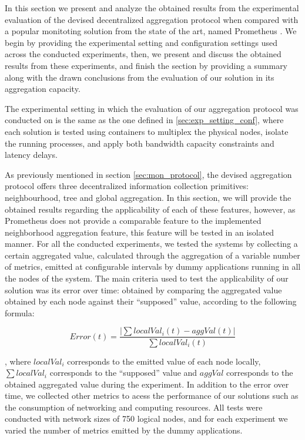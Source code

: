 

In this section we present and analyze the obtained results from the experimental evaluation of the devised decentralized aggregation protocol when compared with a popular monitoting solution from the state of the art, named Prometheus . We begin by providing the experimental setting and configuration settings used across the conducted experiments, then, we present and discuss the obtained results from these experiments, and finish the section by providing a summary along with the drawn conclusions from the evaluation of our solution in its aggregation capacity.

The experimental setting in which the evaluation of our aggregation protocol was conducted on is the same as the one defined in \ref{sec:exp_setting_conf}, where each solution is tested using containers to multiplex the physical nodes, isolate the running processes, and apply both bandwidth capacity constraints and latency delays.

As previously mentioned in section \ref{sec:mon_protocol}, the devised aggregation protocol offers three decentralized information collection primitives: neighbourhood, tree and global aggregation. In this section, we will provide the obtained results regarding the applicability of each of these features, however, as Prometheus does not provide a comparable feature to the implemented neighborhood aggregation feature, this feature will be tested in an isolated manner. For all the conducted experiments, we tested the systems by collecting a certain aggregated value, calculated through the aggregation of a variable number of metrics, emitted at configurable intervals by dummy applications running in all the nodes of the system. The main criteria used to test the applicability of our solution was its error over time: obtained by comparing the aggregated value obtained by each node against their ``supposed'' value, according to the following formula: 

\[ Error(t) =  \frac{|\sum localVal_i(t) - aggVal(t)|}{\sum localVal_i(t)}\]

, where $localVal_i$ corresponds to the emitted value of each node locally, $\sum localVal_i$ corresponds to the ``supposed'' value and $aggVal$ corresponds to the obtained aggregated value during the experiment. In addition to the error over time, we collected other metrics to acess the performance of our solutions such as the consumption of networking and computing resources. All tests were conducted with network sizes of 750 logical nodes, and for each experiment we varied the number of metrics emitted by the dummy applications.

